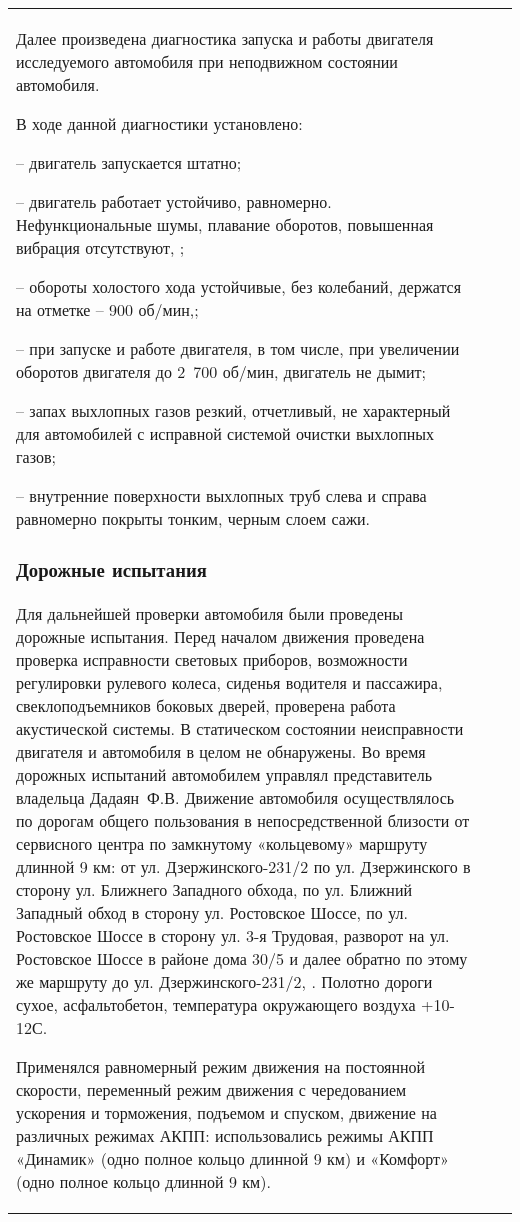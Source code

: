 \begin{longtable}{G{25mm}|M{44mm}|G{70mm}}


Далее произведена диагностика запуска и работы двигателя исследуемого автомобиля при неподвижном состоянии  автомобиля. 

В ходе данной диагностики установлено:

-- двигатель запускается штатно;

-- двигатель работает устойчиво, равномерно. Нефункциональные шумы, плавание оборотов, повышенная вибрация отсутствуют, ;

-- обороты холостого хода устойчивые, без колебаний, держатся на отметке – 900 об/мин,;

-- при запуске и работе двигателя, в том числе, при увеличении оборотов двигателя до 2 700 об/мин, двигатель не дымит;

-- запах выхлопных газов резкий, отчетливый, не характерный для автомобилей с исправной системой очистки выхлопных газов;

-- внутренние поверхности выхлопных труб слева и справа равномерно покрыты тонким, черным слоем сажи.
 	         	

\subsubsection{Дорожные испытания}
 
 Для дальнейшей проверки автомобиля были проведены дорожные испытания. Перед началом движения  проведена проверка исправности световых приборов, возможности регулировки рулевого колеса, сиденья водителя и пассажира, свеклоподъемников боковых дверей, проверена работа акустической системы. В статическом состоянии неисправности двигателя и  автомобиля в целом не обнаружены. Во время дорожных испытаний  автомобилем управлял представитель владельца Дадаян~Ф.В. Движение автомобиля осуществлялось по дорогам общего пользования в непосредственной близости от  сервисного центра по замкнутому «кольцевому» маршруту длинной 9 км: от ул. Дзержинского-231/2 по ул. Дзержинского в сторону ул. Ближнего Западного обхода, по ул. Ближний Западный обход в сторону ул. Ростовское Шоссе, по ул. Ростовское Шоссе в сторону ул. 3-я Трудовая, разворот на ул. Ростовское Шоссе в районе дома 30/5 и далее обратно по этому же маршруту до ул. Дзержинского-231/2, .  Полотно дороги сухое, асфальтобетон, температура окружающего воздуха +10-12 С. 
   
 Применялся  равномерный режим движения на постоянной скорости, переменный режим движения с чередованием ускорения и торможения, подъемом и спуском,  движение на различных режимах АКПП: использовались  режимы АКПП «Динамик» (одно полное кольцо длинной 9 км) и «Комфорт» (одно полное кольцо длинной 9 км).
 

\end{longtable}

